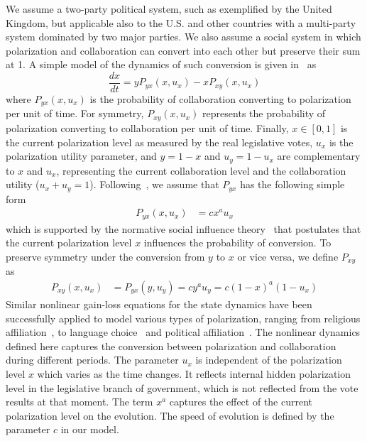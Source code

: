We assume a two-party political system, such as exemplified by the United Kingdom, but applicable also to the U.S. and other countries with a multi-party system dominated by two major parties. We also assume a social system in which polarization and collaboration can convert into each other but preserve their sum at 1.  A simple model of the dynamics of such conversion is given in~\cite{abrams2011dynamics} as
\begin{equation} \label{eq:modela}
    \frac{dx}{dt} = y P_{yx}(x,u_x) - x P_{xy}(x,u_x)
\end{equation} 
where $P_{yx}(x,u_x)$ is the probability of collaboration converting to polarization per unit of time. For symmetry, $P_{xy}(x,u_x)$ represents the probability of polarization converting to collaboration per unit of time. Finally, $x\in[0,1]$ is the current polarization level as measured by the real legislative votes, $u_x$ is the polarization utility parameter, and $y = 1 - x$ and $u_y = 1 - u_x$ are complementary to $x$ and $u_x$, representing the current collaboration level and the collaboration utility ($u_x + u_y = 1$). Following~\cite{abrams2011dynamics}, we assume that $P_{yx}$ has the following simple form
\begin{align} \label{eq:conversion}
P_{yx}(x, u_x) &= c x^a u_x 
\end{align}
which is supported by the normative social influence theory~\cite{deutsch1955study} that postulates that the current polarization level $x$ influences the probability of conversion. To preserve symmetry under the conversion from $y$ to $x$ or vice versa, we define $P_{xy}$ as
\begin{align}
P_{xy}(x,u_x) &= P_{yx}(y,u_y)=cy^au_y=c(1-x)^a(1-u_x)
\end{align}
Similar nonlinear gain-loss equations for the state dynamics have been successfully applied to model various types of polarization, ranging from religious affiliation~\cite{abrams2011dynamics}, to language choice~\cite{abrams2003linguistics} and political affiliation~\cite{frachebourg1996exact}. 
The nonlinear dynamics defined here captures the conversion between polarization and collaboration during different periods. The parameter $u_x$ is independent of the polarization level $x$ which varies as the time changes. It reflects internal hidden polarization level in the legislative branch of government, which is not reflected from the vote results at that moment. The term $x^a$ captures the effect of the current polarization level on the evolution. The speed of evolution is defined by the parameter $c$ in our model.

